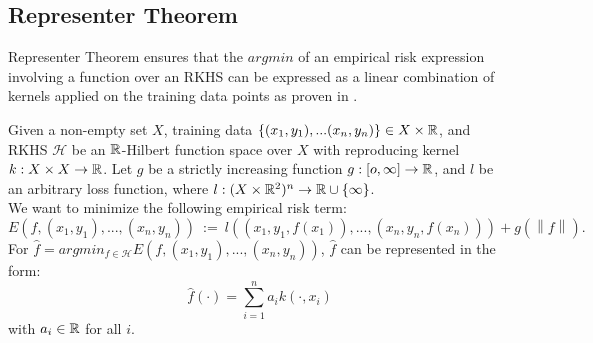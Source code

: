 \documentclass[english]{article}
\newcommand\norm[1]{\left\lVert#1\right\rVert}
\begin{document}
\subsection{Representer Theorem} \label{subsec:RepThm}
Representer Theorem ensures that the $argmin$ of an empirical risk expression involving a function over an RKHS can be expressed as a linear combination of kernels applied on the training data points as proven in \cite{Representer_Theorem}.
\begin{thm} \label{thm:Representer}
	Given a non-empty set $X$, training data $\{(x_1,y_1), ... (x_n,y_n)\} \in X \times \mathbb{R}$, and RKHS $\mathcal{H}$ be an $\mathbb{R}$-Hilbert function space over $X$ with reproducing kernel $k:X \times X \rightarrow \mathbb{R}$. Let $g$ be a strictly increasing function $g:[o, \infty]\rightarrow \mathbb{R}$, and $l$ be an arbitrary loss function, where $l:(X \times \mathbb{R}^2)^n \rightarrow \mathbb{R} \cup \{\infty\}$. \\
	We want to minimize the following empirical risk term:
	\[ E(f, (x_1, y_1), ..., (x_n, y_n)) ~ := ~ l((x_1, y_1, f(x_1)), ..., (x_n, y_n, f(x_n))) + g(\norm{f}) .\]
	For $\hat{f} = argmin_{f \in \mathcal{H}} E(f, (x_1, y_1), ..., (x_n, y_n))$, $\hat{f}$ can be represented in the form:
	\[ \hat{f}(\cdot) = \sum_{i=1}^{n} a_i k(\cdot, x_i) \]
	with $a_i \in \mathbb{R}$ for all $i$.
\end{thm}
\end{document}
